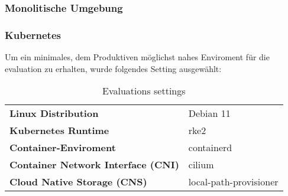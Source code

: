 
\subsubsection{Monolitische Umgebung}
\subsubsection{Kubernetes}
Um ein minimales, dem Produktiven möglichst nahes Enviroment für die evaluation zu erhalten, wurde folgendes Setting ausgewählt:
\begin{table}[]
\begin{tabular}{ll}
\textbf{Linux Distribution}                & Debian 11              \\
\textbf{Kubernetes Runtime}                & rke2                   \\
\textbf{Container-Enviroment}              & containerd             \\
\textbf{Container Network Interface (CNI)} & cilium                 \\
\textbf{Cloud Native Storage (CNS)}        & local-path-provisioner
\end{tabular}
\caption{Evaluations settings}
\label{tab:evaluation-setting}
\end{table}